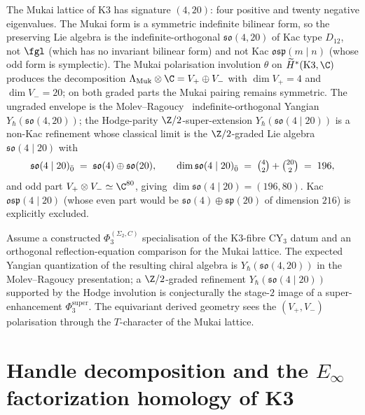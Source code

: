 \begin{remark}
\label{rem:super-yangian-mukai}
The Mukai lattice of K$3$ has signature $(4, 20)$: four positive and twenty negative eigenvalues. The Mukai form is a symmetric indefinite bilinear form, so the preserving Lie algebra is the indefinite-orthogonal $\mathfrak{so}(4, 20)$ of Kac type $D_{12}$, not $\fgl$ (which has no invariant bilinear form) and not Kac $\mathfrak{osp}(m \mid n)$ (whose odd form is symplectic). The Mukai polarisation involution $\theta$ on $\widetilde H^*(\mathrm{K3}, \C)$ produces the decomposition $\Lambda_{\mathrm{Muk}} \otimes \C = V_+ \oplus V_-$ with $\dim V_+ = 4$ and $\dim V_- = 20$; on both graded parts the Mukai pairing remains symmetric. The ungraded envelope is the Molev--Ragoucy~\cite{MolevRagoucy2008} indefinite-orthogonal Yangian $Y_\hbar(\mathfrak{so}(4, 20))$; the Hodge-parity $\Z/2$-super-extension $Y_\hbar(\mathfrak{so}(4 \mid 20))$ is a non-Kac refinement whose classical limit is the $\Z/2$-graded Lie algebra $\mathfrak{so}(4 \mid 20)$ with
\[
 \mathfrak{so}(4 \mid 20)_{\bar 0} \;=\; \mathfrak{so}(4) \oplus \mathfrak{so}(20),
 \qquad \dim \mathfrak{so}(4 \mid 20)_{\bar 0} \;=\; \tbinom{4}{2} + \tbinom{20}{2} \;=\; 196,
\]
and odd part $V_+ \otimes V_- \simeq \C^{80}$, giving $\dim \mathfrak{so}(4 \mid 20) = (196, 80)$. Kac $\mathfrak{osp}(4 \mid 20)$ (whose even part would be $\mathfrak{so}(4) \oplus \mathfrak{sp}(20)$ of dimension $216$) is explicitly excluded.

\begin{conjecture}
\ClaimStatusConjectured
Assume a constructed $\Phi_3^{(\Sigma_2,C)}$ specialisation of the K3-fibre CY$_3$ datum and an orthogonal reflection-equation comparison for the Mukai lattice. The expected Yangian quantization of the resulting chiral algebra is $Y_\hbar(\mathfrak{so}(4, 20))$ in the Molev--Ragoucy presentation; a $\Z/2$-graded refinement $Y_\hbar(\mathfrak{so}(4 \mid 20))$ supported by the Hodge involution is conjecturally the stage-$2$ image of a super-enhancement $\Phi^{\mathrm{super}}_3$. The equivariant derived geometry sees the $(V_+, V_-)$ polarisation through the $T$-character of the Mukai lattice.
\end{conjecture}
\end{remark}
\section{Handle decomposition and the \texorpdfstring{$E_\infty$}{E-inf} factorization homology of K3}
\label{sec:handle-fh-k3}

